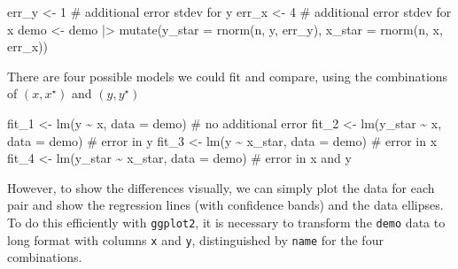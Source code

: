 \documentclass[
  letterpaper,
  10pt,
  krantz2]{krantz}
\makeatletter
\newenvironment{Shaded}{\begin{snugshade}}{\end{snugshade}}
\newcommand{\AttributeTok}[1]{\textcolor[rgb]{0.40,0.45,0.13}{#1}}
\newcommand{\CommentTok}[1]{\textcolor[rgb]{0.37,0.37,0.37}{#1}}
\newcommand{\DecValTok}[1]{\textcolor[rgb]{0.68,0.00,0.00}{#1}}
\newcommand{\FunctionTok}[1]{\textcolor[rgb]{0.28,0.35,0.67}{#1}}
\newcommand{\NormalTok}[1]{\textcolor[rgb]{0.00,0.23,0.31}{#1}}
\newcommand{\OtherTok}[1]{\textcolor[rgb]{0.00,0.23,0.31}{#1}}
\newcommand{\SpecialCharTok}[1]{\textcolor[rgb]{0.37,0.37,0.37}{#1}}
\newenvironment{kframe}{%
  \medskip{}
  \setlength{\fboxsep}{.8em}
  \def\at@end@of@kframe{}%
  \ifinner\ifhmode%
  \def\at@end@of@kframe{\end{minipage}}%
  \begin{minipage}{\columnwidth}%
  \fi\fi%
  \def\FrameCommand##1{\hskip\@totalleftmargin \hskip-\fboxsep
  \colorbox{shadecolor}{##1}\hskip-\fboxsep
      \hskip-\linewidth \hskip-\@totalleftmargin \hskip\columnwidth}%
  \MakeFramed {\advance\hsize-\width
    \@totalleftmargin\z@ \linewidth\hsize
    \@setminipage}}%
{\par\unskip\endMakeFramed%
  \at@end@of@kframe}
\renewenvironment{Shaded}{\begin{kframe}}{\end{kframe}}
\makeatother
\begin{document}
\begin{Shaded}
\begin{Highlighting}[]
\NormalTok{err\_y }\OtherTok{\textless{}{-}} \DecValTok{1}   \CommentTok{\# additional error stdev for y}
\NormalTok{err\_x }\OtherTok{\textless{}{-}} \DecValTok{4}   \CommentTok{\# additional error stdev for x}
\NormalTok{demo  }\OtherTok{\textless{}{-}}\NormalTok{ demo }\SpecialCharTok{|\textgreater{}}
  \FunctionTok{mutate}\NormalTok{(}\AttributeTok{y\_star =} \FunctionTok{rnorm}\NormalTok{(n, y, err\_y),}
         \AttributeTok{x\_star =} \FunctionTok{rnorm}\NormalTok{(n, x, err\_x))}
\end{Highlighting}
\end{Shaded}

There are four possible models we could fit and compare, using the
combinations of \((x, x^\star)\) and \((y, y^\star)\)

\begin{Shaded}
\begin{Highlighting}[]
\NormalTok{fit\_1 }\OtherTok{\textless{}{-}} \FunctionTok{lm}\NormalTok{(y }\SpecialCharTok{\textasciitilde{}}\NormalTok{ x,           }\AttributeTok{data =}\NormalTok{ demo)   }\CommentTok{\# no additional error}
\NormalTok{fit\_2 }\OtherTok{\textless{}{-}} \FunctionTok{lm}\NormalTok{(y\_star }\SpecialCharTok{\textasciitilde{}}\NormalTok{ x,      }\AttributeTok{data =}\NormalTok{ demo)   }\CommentTok{\# error in y}
\NormalTok{fit\_3 }\OtherTok{\textless{}{-}} \FunctionTok{lm}\NormalTok{(y }\SpecialCharTok{\textasciitilde{}}\NormalTok{ x\_star,      }\AttributeTok{data =}\NormalTok{ demo)   }\CommentTok{\# error in x}
\NormalTok{fit\_4 }\OtherTok{\textless{}{-}} \FunctionTok{lm}\NormalTok{(y\_star }\SpecialCharTok{\textasciitilde{}}\NormalTok{ x\_star, }\AttributeTok{data =}\NormalTok{ demo)   }\CommentTok{\# error in x and y}
\end{Highlighting}
\end{Shaded}

However, to show the differences visually, we can simply plot the data
for each pair and show the regression lines (with confidence bands) and
the data ellipses. To do this efficiently with \texttt{ggplot2}, it is
necessary to transform the \texttt{demo} data to long format with
columns \texttt{x} and \texttt{y}, distinguished by \texttt{name} for
the four combinations.
\end{document}
